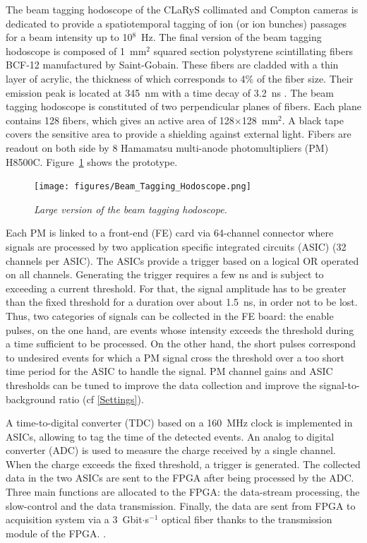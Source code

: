 \documentclass[a4paper,11pt]{article}
\begin{document}
The beam tagging hodoscope of the CLaRyS collimated and Compton cameras is dedicated to provide a spatiotemporal tagging of ion (or ion bunches) passages for a beam intensity up to 10$^{8}$~Hz.
The final version of the beam tagging hodoscope is composed  of 1~mm$^{2}$ squared section polystyrene scintillating fibers BCF-12 manufactured by Saint-Gobain. These fibers are cladded with a thin layer of acrylic, the thickness of which corresponds to 4\% of the fiber size. Their emission peak is located at 345~nm with a time decay of 3.2~ns \cite{SaintGobain2017}.
The beam tagging hodoscope is constituted of two perpendicular planes of fibers. Each plane contains 128 fibers, which gives an active area of 128$\times$128~mm$^{2}$. A black tape covers the sensitive area to provide a shielding against external light. Fibers are readout on both side by 8 Hamamatsu multi-anode photomultipliers (PM) H8500C. Figure~\ref{fig:hodoscope} shows the prototype.

\begin{figure}[htb]
\centering
\texttt{[image: figures/Beam\_Tagging\_Hodoscope.png]}
\caption{\small{\textit{Large version of the beam tagging hodoscope.}}}
\label{fig:hodoscope}
\end{figure}

Each PM is linked to a front-end (FE) card via 64-channel connector where signals are processed by two application specific integrated circuits (ASIC) (32 channels per ASIC). The ASICs provide a trigger based on a logical OR operated on all channels. Generating the trigger requires a few ns and is subject to exceeding a current threshold. For that, the signal amplitude has to be greater than the fixed threshold for a duration over about 1.5~ns, in order not to be lost. Thus, two categories of signals can be collected in the FE board: the enable pulses, on the one hand, are events whose intensity exceeds the threshold during a time sufficient to be processed. On the other hand, the short pulses correspond to undesired events for which a PM signal cross the threshold over a too short time period for the ASIC to handle the signal. PM channel gains and ASIC thresholds can be tuned to improve the data collection and improve the signal-to-background ratio (cf \ref{Settings}).

A time-to-digital converter (TDC) based on a 160~MHz clock is implemented in ASICs, allowing to tag the time of the detected events. An analog to digital converter (ADC) is used to measure the charge received by a single channel. When the charge exceeds the fixed threshold, a trigger is generated. The collected data in the two ASICs are sent to the FPGA after being processed by the ADC. Three main functions are allocated to the FPGA: the data-stream processing, the slow-control and the data transmission. Finally, the data are sent from FPGA to acquisition system via a 3~Gbit$\cdot$s$^{-1}$ optical fiber thanks to the transmission module of the FPGA. \cite{deng2013, Chen2017, Chen2019}.
\end{document}
